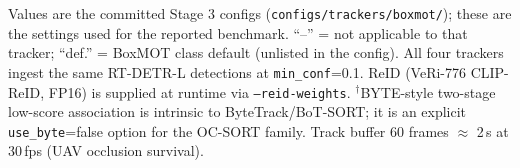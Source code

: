\begin{table}[ht]
\begin{tabular}{lcccc}
    \bottomrule
  \end{tabular}
  \par\smallskip
  \footnotesize Values are the committed Stage 3 configs (\texttt{configs/trackers/boxmot/}); these are the settings used for the reported benchmark. ``--'' = not applicable to that tracker; ``def.'' = BoxMOT class default (unlisted in the config). All four trackers ingest the same RT-DETR-L detections at \texttt{min\_conf}=0.1. ReID (VeRi-776 CLIP-ReID, FP16) is supplied at runtime via \texttt{--reid-weights}. $^\dagger$BYTE-style two-stage low-score association is intrinsic to ByteTrack/BoT-SORT; it is an explicit \texttt{use\_byte}=false option for the OC-SORT family. Track buffer 60 frames $\approx$ 2\,s at 30\,fps (UAV occlusion survival).
\end{table}
